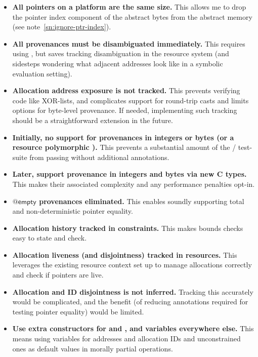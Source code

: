 \begin{itemize}
    \item \textbf{All pointers on a platform are the same size.} This
        allows me to drop the pointer index component of the abstract bytes
        from the abstract memory (see note~\ref{sn:ignore-ptr-index}).
    \item \textbf{All provenances must be disambiguated immediately.} This
        requires using , but saves tracking
        disambiguation in the resource system (and sidesteps wondering what
        adjacent addresses look like in a symbolic evaluation setting).
    \item \textbf{Allocation address exposure is not tracked.} This prevents
        verifying code like XOR-lists, and complicates support for round-trip
        casts and limits options for byte-level provenance. If needed,
        implementing such tracking should be a straightforward extension in the
        future.
    \item \textbf{Initially, no support for provenances in integers or bytes
        (or a resource polymorphic ).}
        This prevents a substantial amount of the /
        test-suite from passing without additional annotations.
    \item \textbf{Later, support provenance in integers and bytes via new C
        types.} This makes their associated complexity and any performance
        penalties opt-in.
    \item \textbf{$@\mathsf{empty}$ provenances eliminated.} This enables
        soundly supporting total and non-deterministic pointer equality.
    \item \textbf{Allocation history tracked in constraints.} This makes
        bounds checks easy to state and check.
    \item \textbf{Allocation liveness (and disjointness) tracked in
        resources.} This leverages the existing resource context set up
        to manage allocations correctly and check if pointers are live.
    \item \textbf{Allocation and ID disjointness is not inferred.} Tracking
        this accurately would be complicated, and the benefit (of reducing
        annotations required for testing pointer equality) would be limited.
    \item \textbf{Use extra constructors for  and
        , and variables everywhere else.} This means using
        variables for addresses and allocation IDs and unconstrained ones as
        default values in morally partial operations.
\end{itemize}

